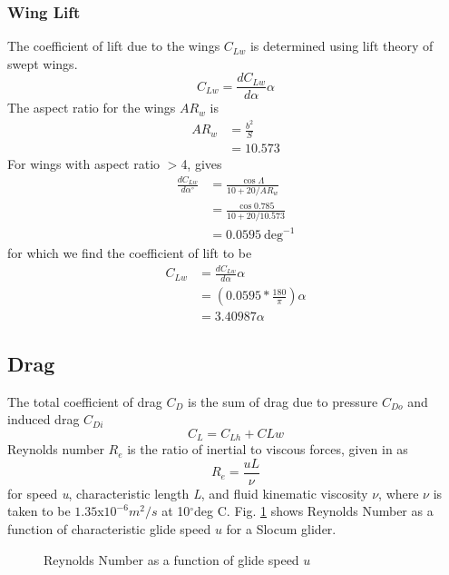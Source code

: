 \documentclass[10pt]{article}
\begin{document}
\subsubsection{Wing Lift}
The coefficient of lift due to the wings $C_{Lw}$ is determined using lift theory of swept wings.
\begin{equation}
C_{Lw} = \frac{dC_{Lw}}{d\alpha}\alpha
\end{equation}
The aspect ratio for the wings $AR_{w}$ is
\begin{align}
AR_w &= \frac{b^2}{S}\\
&= 10.573
\end{align}
For wings with aspect ratio $>$4, \cite[pg. 15-7]{Hoerner:1985} gives 
\begin{align}
\frac{dC_{Lw}}{d\alpha^\circ} &= \frac{\cos{\Lambda}}{10+20/AR_w}\\
&=\frac{\cos 0.785}{10+20/10.573}\\
&=0.0595~\text{deg}^{-1}
\end{align}
for which we find the coefficient of lift to be
\begin{align}
C_{Lw} &= \frac{dC_{Lw}}{d\alpha}\alpha \\
&=(0.0595*\frac{180}{\pi})\alpha\\
&=3.40987\alpha
\end{align}

\subsection{Drag}
The total coefficient of drag $C_D$ is the sum of drag due to pressure $C_{Do}$ and induced drag $C_{Di}$
\begin{equation}
C_L = C_{Lh} + C{Lw}
\end{equation}
Reynolds number $R_e$ is the ratio of inertial to viscous forces, given in \cite[Table A.2]{Newman:1977} as
\begin{equation}\label{eq:Re}
R_e = \frac{uL}{\nu}
\end{equation}
for speed \textit{u}, characteristic length \textit{L}, and fluid kinematic viscosity $\nu$, where $\nu$ is taken to be $1.35$x$10^{-6}m^2/s$ at 10$^\circ$deg C.  Fig. \ref{fig:Re} shows Reynolds Number as a function of characteristic glide speed $u$ for a Slocum glider.

      \begin{figure}[htb]
        \caption{\label{fig:Re} Reynolds Number as a function of glide speed $u$}
      \end{figure}
\end{document}
